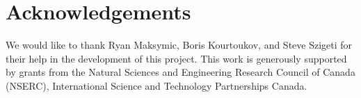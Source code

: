 \documentclass{chi-ext}
\begin{document}
\section{Acknowledgements}

We would like to thank Ryan Maksymic, Boris Kourtoukov, and Steve Szigeti for their help in the development of this project. This work is generously supported by grants from the Natural Sciences and Engineering Research Council of Canada (NSERC), International Science and Technology Partnerships Canada.

\balance


\end{document}
